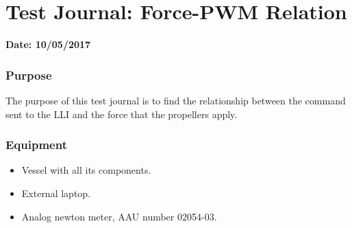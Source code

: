 \chapter{Test Journal: Force-PWM Relation}\label{app:forceTest}

\textbf{Date: 10/05/2017}

\subsection*{Purpose}
The purpose of this test journal is to find the relationship between the command sent to the LLI and the force that the propellers apply.


\subsection*{Equipment}
\begin{itemize}
	\item Vessel with all its components.
	\item External laptop.
    \item Analog newton meter, AAU number 02054-03.
\end{itemize}

